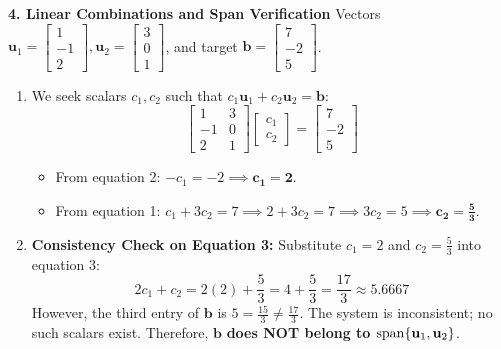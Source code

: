 \textbf{4. Linear Combinations and Span Verification}
Vectors $\mathbf{u}_1 = \begin{bmatrix} 1 \\ -1 \\ 2 \end{bmatrix}, \mathbf{u}_2 = \begin{bmatrix} 3 \\ 0 \\ 1 \end{bmatrix}$, and target $\mathbf{b} = \begin{bmatrix} 7 \\ -2 \\ 5 \end{bmatrix}$.
\begin{enumerate}
    \item We seek scalars $c_1, c_2$ such that $c_1 \mathbf{u}_1 + c_2 \mathbf{u}_2 = \mathbf{b}$:
    \begin{equation*}
    \begin{bmatrix} 1 & 3 \\ -1 & 0 \\ 2 & 1 \end{bmatrix} \begin{bmatrix} c_1 \\ c_2 \end{bmatrix} = \begin{bmatrix} 7 \\ -2 \\ 5 \end{bmatrix}
    \end{equation*}
    \begin{itemize}
        \item From equation 2: $-c_1 = -2 \implies \mathbf{c_1 = 2}$.
        \item From equation 1: $c_1 + 3c_2 = 7 \implies 2 + 3c_2 = 7 \implies 3c_2 = 5 \implies \mathbf{c_2 = \frac{5}{3}}$.
    \end{itemize}
    \item \textbf{Consistency Check on Equation 3:}
    Substitute $c_1 = 2$ and $c_2 = \frac{5}{3}$ into equation 3:
    \begin{equation*}
    2c_1 + c_2 = 2(2) + \frac{5}{3} = 4 + \frac{5}{3} = \frac{17}{3} \approx 5.6667
    \end{equation*}
    However, the third entry of $\mathbf{b}$ is $5 = \frac{15}{3} \neq \frac{17}{3}$.
    The system is inconsistent; no such scalars exist. Therefore, $\mathbf{b}$ \textbf{does NOT belong to $\operatorname{span}\{\mathbf{u}_1, \mathbf{u}_2\}$}.
\end{enumerate}

